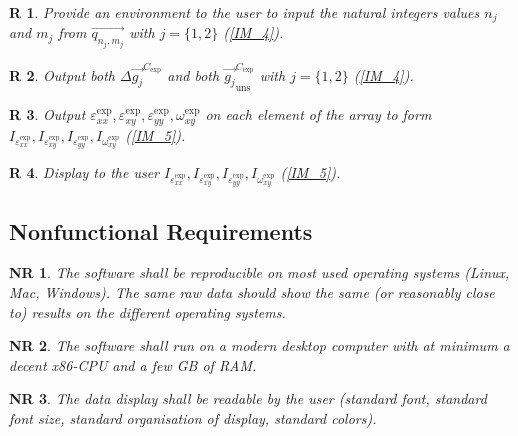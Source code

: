 \documentclass[12pt]{article}
\newtheorem{R}{R}
\newtheorem{NR}{NR}
\begin{document}
\begin{R}
\label{R_11}
\normalfont Provide an environment to the user to input the natural integers values $n_j$ and $m_j$ from $\overrightarrow{q_{n_j,m_j}}$ with $j=\{1,2\}$ (\cref{IM_4}).
\end{R}
\begin{R}
\label{R_12}
\normalfont Output both  $\Delta \overrightarrow{g_{j}}^{C_{\text{exp}}}$ and both $\overrightarrow{g_{j}}_{\text{uns}}^{C_{\text{exp}}}$ with $j=\{1,2\}$ (\cref{IM_4}).
\end{R}
\begin{R}
\label{R_13}
\normalfont Output $\varepsilon_{\mathit{xx}}^{\text{exp}},\varepsilon_{\mathit{xy}}^{\text{exp}},\varepsilon_{\mathit{yy}}^{\text{exp}},\omega_{\mathit{xy}}^{\text{exp}}$ on each element of the array to form $I_{\varepsilon_{\mathit{xx}}^{\text{exp}}},I_{\varepsilon_{\mathit{xy}}^{\text{exp}}},I_{\varepsilon_{\mathit{yy}}^{\text{exp}}},I_{\omega_{\mathit{xy}}^{\text{exp}}}$ (\cref{IM_5}).
\end{R}
\begin{R}
\label{R_14}
\normalfont Display to the user $I_{\varepsilon_{\mathit{xx}}^{\text{exp}}},I_{\varepsilon_{\mathit{xy}}^{\text{exp}}},I_{\varepsilon_{\mathit{yy}}^{\text{exp}}},I_{\omega_{\mathit{xy}}^{\text{exp}}}$ (\cref{IM_5}).
\end{R}

\subsection{Nonfunctional Requirements}

\begin{NR}
\label{NR_1} 
\normalfont The software shall be reproducible on most used operating systems (Linux, Mac, Windows). The same raw data should show the same (or reasonably close to) results on the different operating systems. 
\end{NR}

\begin{NR}
\label{NR_2} 
\normalfont The software shall run on a modern desktop computer with at minimum a decent x86-CPU and a few GB of RAM.
\end{NR}

\begin{NR}
\label{NR_3} 
\normalfont The data display shall be readable by the user (standard font, standard font size, standard organisation of display, standard colors).
\end{NR}
\end{document}
